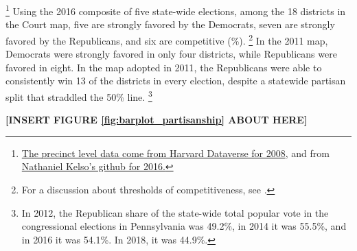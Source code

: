         \footnote{ \href{https://bit.ly/2NsvXyv}{The precinct level data come from Harvard Dataverse for 2008}, and from \href{https://bit.ly/2PJMyzn}{Nathaniel Kelso’s github for 2016.}}
Using the 2016 composite of five state-wide elections, among the 18 districts in the Court map, five are strongly favored by the Democrats, seven are strongly favored by the Republicans, and six are competitive (\%).
        \footnote{For a discussion about thresholds of competitiveness, see \citet{CervasGrofman2017_PC}. }
In the 2011 map, Democrats were strongly favored in only four districts, while Republicans were favored in eight. In the map adopted in 2011, the Republicans were able to consistently win 13 of the districts in every election, despite a statewide partisan split that straddled the 50\% line.
        \footnote{In 2012, the Republican share of the state-wide total popular vote in the congressional elections in Pennsylvania was 49.2\%, in 2014 it was 55.5\%, and in 2016 it was 54.1\%. In 2018, it was 44.9\%.}
%
    \begin{center}\textbf{[INSERT FIGURE \ref{fig:barplot_partisanship} ABOUT HERE]}\end{center}
